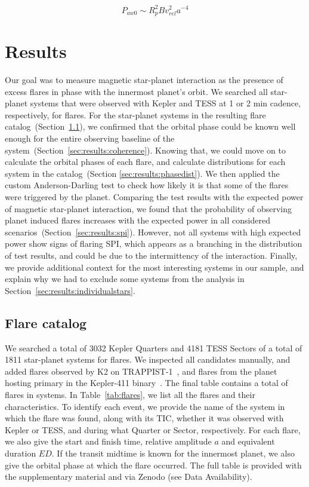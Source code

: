 \documentclass[twocolumn]{aastex631}
\begin{document}
\begin{equation}
    P_{aw0} \sim R_p^2  B  v_{rel}^2  a^{-4}
\end{equation}


\section{Results}
\label{sec:results}

Our goal was to measure magnetic star-planet interaction as the presence of excess flares in phase with the innermost planet's orbit. We searched all star-planet systems that were observed with Kepler and TESS at 1 or 2 min cadence, respectively, for flares. For the star-planet systems in the resulting flare catalog~(Section~\ref{sec:results:catalog}), we confirmed that the orbital phase could be known well enough for the entire observing baseline of the system~(Section~\ref{sec:results:coherence}). Knowing that, we could move on to calculate the orbital phases of each flare, and calculate distributions for each system in the catalog~(Section \ref{sec:results:phasedist}). We then applied the custom Anderson-Darling test to check how likely it is that some of the flares were triggered by the planet. Comparing the test results with the expected power of magnetic star-planet interaction, we found that the probability of observing planet induced flares increases with the expected power in all considered scenarios~(Section~\ref{sec:results:spi}). However, not all systems with high expected power show signs of flaring SPI, which appears as a branching in the distribution of test results, and could be due to the intermittency of the interaction. Finally, we provide additional context for the most interesting systems in our sample, and explain why we had to exclude some systems from the analysis in Section~\ref{sec:results:individualstars}.
\subsection{Flare catalog}
\label{sec:results:catalog}
We searched a total of 3032 Kepler Quarters and 4181 TESS Sectors of a total of 1811 star-planet systems for flares. We inspected all candidates manually, and added flares observed by K2 on TRAPPIST-1~\cite{paudel2018k2}, and flares from the planet hosting primary in the Kepler-411 binary~\cite{jackman2021stellara}. The final table contains a total of  flares in  systems. In Table~\ref{tab:flares}, we list all the flares and their characteristics. To identify each event, we provide the name of the system in which the flare was found, along with its TIC, whether it was observed with Kepler or TESS, and during what Quarter or Sector, respectively. For each flare, we also give the start and finish time, relative amplitude $a$ and equivalent duration $ED$. If the transit midtime is known for the innermost planet, we also give the orbital phase at which the flare occurred. The full table is provided with the supplementary material and via Zenodo (see Data Availability).
\end{document}
